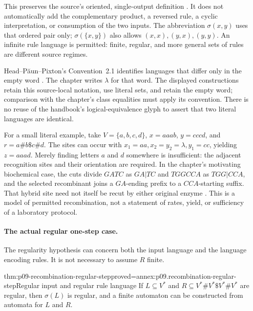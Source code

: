This preserves the source's oriented, single-output definition
\cite[pp.~298--300]{HeadPaunPixton1997RecombinationIntake}.
It does not automatically add the complementary product, a reversed rule,
a cyclic interpretation, or consumption of the two inputs.
The abbreviation \(\sigma(x,y)\) uses that ordered pair only;
\(\sigma(\{x,y\})\) also allows \((x,x),(y,x),(y,y)\).
An infinite rule language is permitted: finite, regular, and more general
sets of rules are different source regimes.

Head--P\u{a}un--Pixton's Convention~2.1 identifies languages that differ
only in the empty word \cite[p.~298]{HeadPaunPixton1997RecombinationIntake}.
The chapter writes \(\lambda\) for that word. The displayed constructions
retain this source-local notation, use literal sets, and retain the empty word;
comparison with the chapter's class equalities must apply its convention.
There is no reuse of the handbook's logical-equivalence glyph to assert
that two literal languages are identical.

For a small literal example, take \(V=\{a,b,c,d\}\),
\(x=aaab\), \(y=cccd\), and \(r=a\#b\$c\#d\).
The sites can occur with \(x_1=aa,x_2=y_2=\lambda,y_1=cc\), yielding
\(z=aaad\). Merely finding letters \(a\) and \(d\) somewhere is insufficient:
the adjacent recognition sites and their orientation are required.
In the chapter's motivating biochemical case, the cuts divide \(GATC\)
as \(GA|TC\) and \(TGGCCA\) as \(TGG|CCA\), and the selected recombinant
joins a \(GA\)-ending prefix to a \(CCA\)-starting suffix. That hybrid site
need not itself be recut by either original enzyme
\cite[pp.~295--297]{HeadPaunPixton1997RecombinationIntake}.
This is a model of permitted recombination, not a statement of rates,
yield, or sufficiency of a laboratory protocol.

\paragraph{The actual regular one-step case.}
The regularity hypothesis can concern both the input language and the
language encoding rules. It is not necessary to assume \(R\) finite.

\begin{hbtheorem}{thm:p09-recombination-regular-step}{proved=annex:p09.recombination-regular-step}{Regular input and regular rule language}
If \(L\subseteq V^*\) and
\(R\subseteq V^*\#V^*\$V^*\#V^*\) are regular, then
\(\sigma(L)\) is regular, and a finite automaton can be constructed from
automata for \(L\) and \(R\).
\end{hbtheorem}

